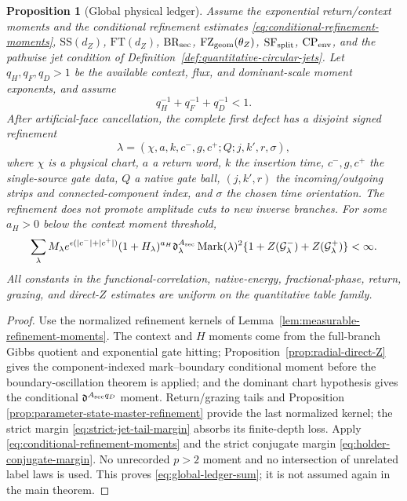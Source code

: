 \documentclass[11pt]{article}
\newtheorem{proposition}[theorem]{Proposition}
\begin{document}
\begin{proposition}[Global physical ledger]
\label{prop:global-labelled-ledger}
Assume the exponential return/context moments and the conditional refinement
estimates \eqref{eq:conditional-refinement-moments},
$\mathrm{SS}(d_Z)$, $\mathrm{FT}(d_Z)$,
$\mathrm{BR}_{\rm sec}$, $\mathrm{FZ}_{\rm geom}(\theta_Z)$,
$\mathrm{SF}_{\rm split}$, $\mathrm{CP}_{\rm env}$, and the pathwise jet condition of
Definition~\ref{def:quantitative-circular-jets}.  Let $q_H,q_F,q_D>1$ be the
available context, flux, and dominant-scale moment exponents, and assume
\begin{equation}
\label{eq:holder-conjugate-margin}
 q_H^{-1}+q_F^{-1}+q_D^{-1}<1.
\end{equation}
After artificial-face cancellation, the complete first defect has a disjoint
signed refinement
\begin{equation}
\label{eq:global-label}
 \lambda=(\chi,a,k,c^-,g,c^+;Q;j,k',r,\sigma),
\end{equation}
where $\chi$ is a physical chart, $a$ a return word, $k$ the insertion time,
$c^-,g,c^+$ the single-source gate data, $Q$ a native gate ball,
$(j,k',r)$ the incoming/outgoing strips and connected-component index, and
$\sigma$ the chosen time orientation.  The refinement does not promote
amplitude cuts to new inverse branches.  For some $a_H>0$ below the context
moment threshold,
\begin{equation}
\label{eq:global-ledger-sum}
 \sum_\lambda M_\lambda
 e^{\epsilon(|c^-|+|c^+|)}
 (1+H_\lambda)^{a_H}\mathfrak d_\lambda^{A_{\rm sec}}
 \operatorname{Mark}(\lambda)^2
 \{1+Z(\mathcal G_\lambda^-)+Z(\mathcal G_\lambda^+)\}<\infty.
\end{equation}
All constants in the functional-correlation, native-energy,
fractional-phase, return, grazing, and direct-$Z$ estimates are uniform on
the quantitative table family.
\end{proposition}

\begin{proof}
Use the normalized refinement kernels of
Lemma~\ref{lem:measurable-refinement-moments}.  The context and $H$ moments
come from the full-branch Gibbs quotient and exponential gate hitting;
Proposition~\ref{prop:radial-direct-Z} gives the component-indexed
mark--boundary conditional moment before the boundary-oscillation theorem is
applied; and the dominant chart hypothesis gives the conditional
$\mathfrak d^{A_{\rm sec}q_D}$ moment.  Return/grazing tails and Proposition
\ref{prop:parameter-state-master-refinement} provide the last normalized
kernel; the strict margin \eqref{eq:strict-jet-tail-margin} absorbs its
finite-depth loss.  Apply \eqref{eq:conditional-refinement-moments} and the
strict conjugate margin \eqref{eq:holder-conjugate-margin}.  No unrecorded
$p>2$ moment and no intersection of unrelated label laws is used.  This proves
\eqref{eq:global-ledger-sum}; it is not assumed again in the main theorem.
\end{proof}
\end{document}
